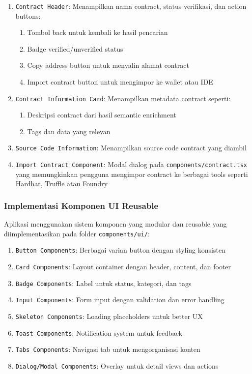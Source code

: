 \begin{enumerate}
	\item \texttt{Contract Header}: Menampilkan nama contract, status verifikasi, dan action buttons:
	      \begin{enumerate}
		      \item Tombol back untuk kembali ke hasil pencarian
		      \item Badge verified/unverified status
		      \item Copy address button untuk menyalin alamat contract
		      \item Import contract button untuk mengimpor ke wallet atau IDE
	      \end{enumerate}
	\item \texttt{Contract Information Card}: Menampilkan metadata contract seperti:
	      \begin{enumerate}
		      \item Deskripsi contract dari hasil semantic enrichment
		      \item Tags dan data yang relevan
	      \end{enumerate}
	\item \texttt{Source Code Information}: Menampilkan source code contract yang diambil
	\item \texttt{Import Contract Component}: Modal dialog pada \texttt{components/\-contract.tsx} yang memungkinkan pengguna mengimpor contract ke berbagai tools seperti Hardhat, Truffle atau Foundry
\end{enumerate}

\subsubsection{Implementasi Komponen UI Reusable}

Aplikasi menggunakan sistem komponen yang modular dan reusable yang diimplementasikan pada folder \texttt{components/ui/}:

\begin{enumerate}
	\item \texttt{Button Components}: Berbagai varian button dengan styling konsisten
	\item \texttt{Card Components}: Layout container dengan header, content, dan footer
	\item \texttt{Badge Components}: Label untuk status, kategori, dan tags
	\item \texttt{Input Components}: Form input dengan validation dan error handling
	\item \texttt{Skeleton Components}: Loading placeholders untuk better UX
	\item \texttt{Toast Components}: Notification system untuk feedback
	\item \texttt{Tabs Components}: Navigasi tab untuk mengorganisasi konten
	\item \texttt{Dialog/Modal Components}: Overlay untuk detail views dan actions
\end{enumerate}

